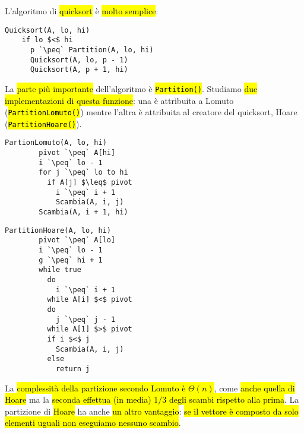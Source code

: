 \documentclass[a4paper,11pt,oneside]{article}
\theoremstyle{plain}
\theoremstyle{definition}
\theoremstyle{remark}
\newcommand{\peq}{$\gets$}
\begin{document}
L'algoritmo di \hl{quicksort} è \hl{molto semplice}:

\begin{lstlisting}[language=pseudocodice,gobble=2]
  Quicksort(A, lo, hi)
    if lo $<$ hi
      p `\peq` Partition(A, lo, hi)
      Quicksort(A, lo, p - 1)
      Quicksort(A, p + 1, hi)
\end{lstlisting}

La \hl{parte più importante} dell'algoritmo è \hl{\texttt{Partition()}}. %
Studiamo \hl{due implementazioni di questa funzione}: una è attribuita a Lomuto
(\hl{\texttt{PartitionLomuto()}}) mentre l'altra è attribuita al creatore del %
quicksort, Hoare (\hl{\texttt{PartitionHoare()}}). %

\noindent\begin{minipage}{\textwidth}
  \centering
  \begin{minipage}{0.45\textwidth}
    \begin{lstlisting}[language=pseudocodice,gobble=6,xleftmargin=0pt]
      PartionLomuto(A, lo, hi)
        pivot `\peq` A[hi]
        i `\peq` lo - 1
        for j `\peq` lo to hi
          if A[j] $\leq$ pivot
            i `\peq` i + 1
            Scambia(A, i, j)
        Scambia(A, i + 1, hi)
    \end{lstlisting}
  \end{minipage}
  \begin{minipage}{0.45\textwidth}
    \begin{lstlisting}[language=pseudocodice,gobble=6,xleftmargin=0pt]
      PartitionHoare(A, lo, hi)
        pivot `\peq` A[lo]
        i `\peq` lo - 1
        g `\peq` hi + 1
        while true
          do
            i `\peq` i + 1
          while A[i] $<$ pivot
          do
            j `\peq` j - 1
          while A[1] $>$ pivot
          if i $<$ j
            Scambia(A, i, j)
          else
            return j
    \end{lstlisting}
  \end{minipage}
\end{minipage}

La \hl{complessità della partizione secondo Lomuto è $\Theta(n)$}, come
\hl{anche quella di Hoare} ma la \hl{seconda effettua (in media) $1/3$ degli
scambi rispetto alla prima}. La partizione di \hl{Hoare} ha anche \hl{un altro
vantaggio}: \hl{se il vettore è composto da solo elementi uguali non eseguiamo
nessuno scambio}.
\end{document}
